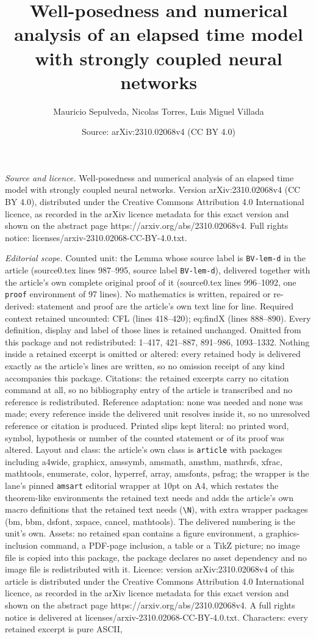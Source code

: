 \documentclass[10pt,a4paper]{amsart}
\title[Well-posedness and numerical analysis of an elapsed time mod]{Well-posedness and numerical analysis of an elapsed time model with strongly coupled neural networks}
\author{Mauricio Sepulveda, Nicolas Torres, Luis Miguel Villada}
\date{Source: arXiv:2310.02068v4 (CC BY 4.0)}
\begin{document}
\maketitle

\noindent\emph{Source and licence.} Well-posedness and numerical analysis of an elapsed time model with strongly coupled neural networks. Version arXiv:2310.02068v4 (CC BY 4.0), distributed under the Creative Commons Attribution 4.0 International licence, as recorded in the arXiv licence metadata for this exact version and shown on the abstract page https://arxiv.org/abs/2310.02068v4. Full rights notice: licenses/arxiv-2310.02068-CC-BY-4.0.txt.\par\smallskip

\noindent\textit{Editorial scope.} Counted unit: the Lemma whose source label is \texttt{BV-lem-d} in the article (source0.tex lines 987--995, source label \texttt{BV-lem-d}), delivered together with the article's own complete original proof of it (source0.tex lines 996--1092, one \texttt{proof} environment of 97 lines). No mathematics is written, repaired or re-derived: statement and proof are the article's own text line for line. Required context retained uncounted: CFL (lines 418--420); eq:findX (lines 888--890). Every definition, display and label of those lines is retained unchanged. Omitted from this package and not redistributed: 1--417, 421--887, 891--986, 1093--1332. Nothing inside a retained excerpt is omitted or altered: every retained body is delivered exactly as the article's lines are written, so no omission receipt of any kind accompanies this package. Citations: the retained excerpts carry no citation command at all, so no bibliography entry of the article is transcribed and no reference is redistributed. Reference adaptation: none was needed and none was made; every reference inside the delivered unit resolves inside it, so no unresolved reference or citation is produced. Printed slips kept literal: no printed word, symbol, hypothesis or number of the counted statement or of its proof was altered. Layout and class: the article's own class is \texttt{article} with packages including a4wide, graphicx, amssymb, amsmath, amsthm, mathrsfs, xfrac, mathtools, enumerate, color, hyperref, array, amsfonts, psfrag; the wrapper is the lane's pinned \texttt{amsart} editorial wrapper at 10pt on A4, which restates the theorem-like environments the retained text needs and adds the article's own macro definitions that the retained text needs (\texttt{\textbackslash N}), with extra wrapper packages (bm, bbm, dsfont, xspace, cancel, mathtools). The delivered numbering is the unit's own. Assets: no retained span contains a figure environment, a graphics-inclusion command, a PDF-page inclusion, a table or a TikZ picture; no image file is copied into this package, the package declares no asset dependency and no image file is redistributed with it. Licence: version arXiv:2310.02068v4 of this article is distributed under the Creative Commons Attribution 4.0 International licence, as recorded in the arXiv licence metadata for this exact version and shown on the abstract page https://arxiv.org/abs/2310.02068v4. A full rights notice is delivered at licenses/arxiv-2310.02068-CC-BY-4.0.txt. Characters: every retained excerpt is pure ASCII, 
\end{document}
